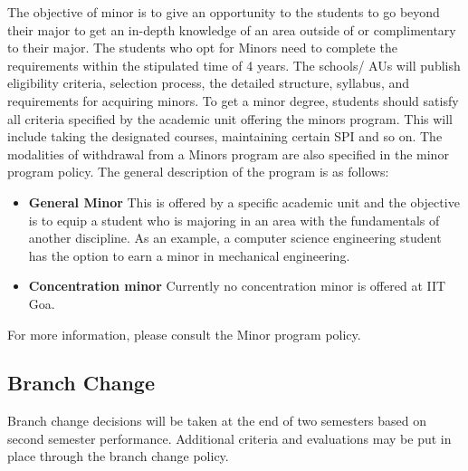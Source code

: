 The objective of minor is to give an opportunity to the students to go beyond their major to get an in-depth knowledge of an area outside of or complimentary to their major. The students who opt for Minors need to complete the requirements within the stipulated time of 4 years. The schools/ AUs will publish eligibility criteria, selection process, the detailed structure, syllabus, and requirements for acquiring minors. To get a minor degree, students should satisfy all criteria specified by the academic unit offering the minors program. This will include taking the designated courses, maintaining certain SPI and so on. The modalities of withdrawal from a Minors program are also specified in the minor program policy. The general description of the program is as follows: 

\begin{itemize}
	\item \textbf{General Minor} This is offered by a specific academic unit and the objective is to equip a student who is majoring in an area with the fundamentals of another discipline. As an example, a computer science engineering student has the option to earn a minor in mechanical engineering.
	\item \textbf{Concentration minor} Currently no concentration minor is offered at IIT Goa.
\end{itemize}

For more information, please consult the Minor program policy.

\subsection{Branch Change}

Branch change decisions will be taken at the end of two semesters based on second semester performance. Additional criteria and evaluations may be put in place through the branch change policy.
